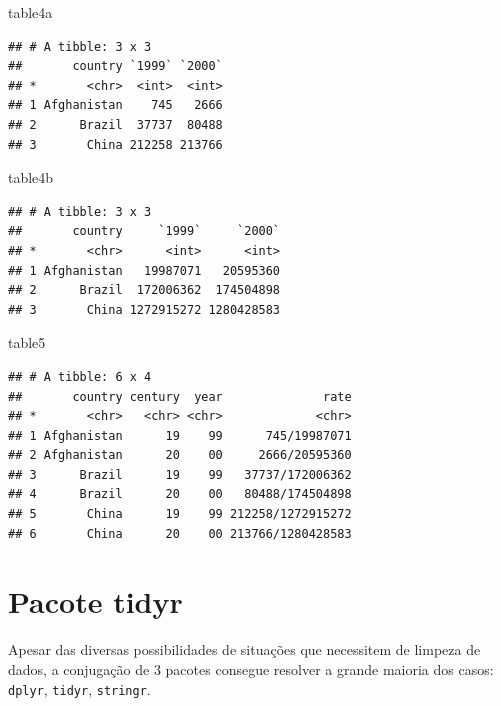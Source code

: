 \documentclass[]{book}
\newenvironment{Shaded}{\begin{snugshade}}{\end{snugshade}}
\newcommand{\NormalTok}[1]{#1}
\begin{document}
\begin{Shaded}
\begin{Highlighting}[]
\NormalTok{table4a}
\end{Highlighting}
\end{Shaded}

\begin{verbatim}
## # A tibble: 3 x 3
##       country `1999` `2000`
## *       <chr>  <int>  <int>
## 1 Afghanistan    745   2666
## 2      Brazil  37737  80488
## 3       China 212258 213766
\end{verbatim}

\begin{Shaded}
\begin{Highlighting}[]
\NormalTok{table4b}
\end{Highlighting}
\end{Shaded}

\begin{verbatim}
## # A tibble: 3 x 3
##       country     `1999`     `2000`
## *       <chr>      <int>      <int>
## 1 Afghanistan   19987071   20595360
## 2      Brazil  172006362  174504898
## 3       China 1272915272 1280428583
\end{verbatim}

\begin{Shaded}
\begin{Highlighting}[]
\NormalTok{table5}
\end{Highlighting}
\end{Shaded}

\begin{verbatim}
## # A tibble: 6 x 4
##       country century  year              rate
## *       <chr>   <chr> <chr>             <chr>
## 1 Afghanistan      19    99      745/19987071
## 2 Afghanistan      20    00     2666/20595360
## 3      Brazil      19    99   37737/172006362
## 4      Brazil      20    00   80488/174504898
## 5       China      19    99 212258/1272915272
## 6       China      20    00 213766/1280428583
\end{verbatim}

\section{Pacote tidyr}\label{pacote-tidyr}

Apesar das diversas possibilidades de situações que necessitem de
limpeza de dados, a conjugação de 3 pacotes consegue resolver a grande
maioria dos casos: \texttt{dplyr}, \texttt{tidyr}, \texttt{stringr}.
\end{document}
